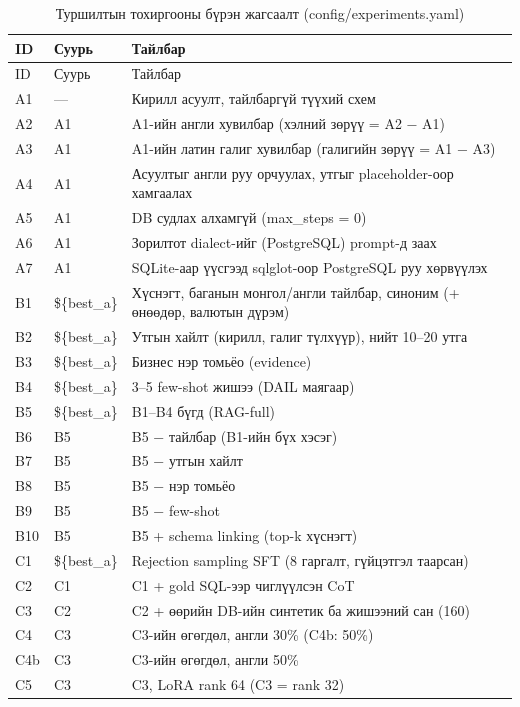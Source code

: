 \begin{small}
\begin{longtable}{p{1.0cm}p{2.6cm}p{9.6cm}}
\caption{Туршилтын тохиргооны бүрэн жагсаалт (config/experiments.yaml)}\label{tab:all-experiments}\\
\toprule ID & Суурь & Тайлбар \\\midrule\endfirsthead
\toprule ID & Суурь & Тайлбар \\\midrule\endhead
A1 & — & Кирилл асуулт, тайлбаргүй түүхий схем \\
A2 & A1 & A1-ийн англи хувилбар (хэлний зөрүү = A2 − A1) \\
A3 & A1 & A1-ийн латин галиг хувилбар (галигийн зөрүү = A1 − A3) \\
A4 & A1 & Асуултыг англи руу орчуулах, утгыг placeholder-оор хамгаалах \\
A5 & A1 & DB судлах алхамгүй (max\_steps = 0) \\
A6 & A1 & Зорилтот dialect-ийг (PostgreSQL) prompt-д заах \\
A7 & A1 & SQLite-аар үүсгээд sqlglot-оор PostgreSQL руу хөрвүүлэх \\
B1 & \$\{best\_a\} & Хүснэгт, баганын монгол/англи тайлбар, синоним (+ өнөөдөр, валютын дүрэм) \\
B2 & \$\{best\_a\} & Утгын хайлт (кирилл, галиг түлхүүр), нийт 10–20 утга \\
B3 & \$\{best\_a\} & Бизнес нэр томьёо (evidence) \\
B4 & \$\{best\_a\} & 3–5 few-shot жишээ (DAIL маягаар) \\
B5 & \$\{best\_a\} & B1–B4 бүгд (RAG-full) \\
B6 & B5 & B5 − тайлбар (B1-ийн бүх хэсэг) \\
B7 & B5 & B5 − утгын хайлт \\
B8 & B5 & B5 − нэр томьёо \\
B9 & B5 & B5 − few-shot \\
B10 & B5 & B5 + schema linking (top-k хүснэгт) \\
C1 & \$\{best\_a\} & Rejection sampling SFT (8 гаргалт, гүйцэтгэл таарсан) \\
C2 & C1 & C1 + gold SQL-ээр чиглүүлсэн CoT \\
C3 & C2 & C2 + өөрийн DB-ийн синтетик ба жишээний сан (160) \\
C4 & C3 & C3-ийн өгөгдөл, англи 30\% (C4b: 50\%) \\
C4b & C3 & C3-ийн өгөгдөл, англи 50\% \\
C5 & C3 & C3, LoRA rank 64 (C3 = rank 32) \\

\end{longtable}
\end{small}
